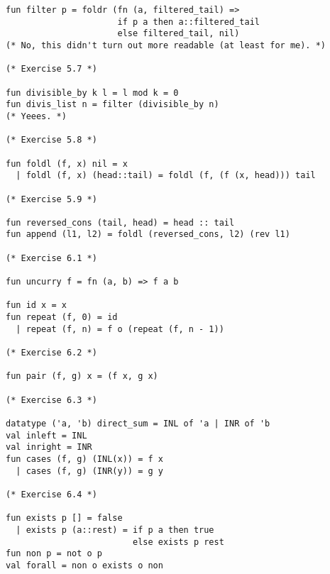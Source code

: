 \begin{verbatim}
fun filter p = foldr (fn (a, filtered_tail) => 
                      if p a then a::filtered_tail
                      else filtered_tail, nil)                       
(* No, this didn't turn out more readable (at least for me). *)

(* Exercise 5.7 *) 

fun divisible_by k l = l mod k = 0
fun divis_list n = filter (divisible_by n)
(* Yeees. *)

(* Exercise 5.8 *) 

fun foldl (f, x) nil = x
  | foldl (f, x) (head::tail) = foldl (f, (f (x, head))) tail

(* Exercise 5.9 *) 

fun reversed_cons (tail, head) = head :: tail 
fun append (l1, l2) = foldl (reversed_cons, l2) (rev l1)

(* Exercise 6.1 *) 

fun uncurry f = fn (a, b) => f a b

fun id x = x
fun repeat (f, 0) = id
  | repeat (f, n) = f o (repeat (f, n - 1))

(* Exercise 6.2 *) 

fun pair (f, g) x = (f x, g x)

(* Exercise 6.3 *) 
 
datatype ('a, 'b) direct_sum = INL of 'a | INR of 'b
val inleft = INL
val inright = INR
fun cases (f, g) (INL(x)) = f x
  | cases (f, g) (INR(y)) = g y

(* Exercise 6.4 *) 

fun exists p [] = false 
  | exists p (a::rest) = if p a then true 
                         else exists p rest
fun non p = not o p
val forall = non o exists o non
\end{verbatim}

%

